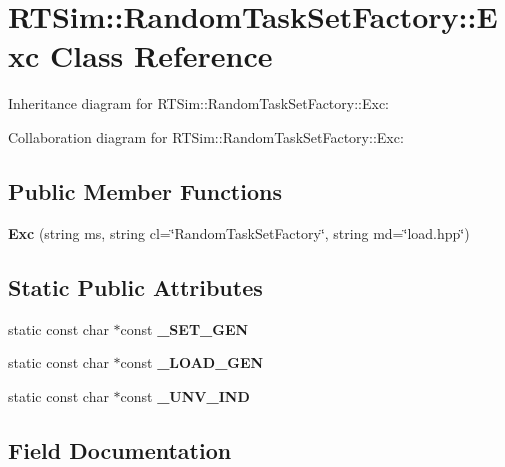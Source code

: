 \hypertarget{classRTSim_1_1RandomTaskSetFactory_1_1Exc}{}\section{R\+T\+Sim\+:\+:Random\+Task\+Set\+Factory\+:\+:Exc Class Reference}
\label{classRTSim_1_1RandomTaskSetFactory_1_1Exc}


Inheritance diagram for R\+T\+Sim\+:\+:Random\+Task\+Set\+Factory\+:\+:Exc\+:


Collaboration diagram for R\+T\+Sim\+:\+:Random\+Task\+Set\+Factory\+:\+:Exc\+:
\subsection*{Public Member Functions}
\begin{DoxyCompactItemize}
\item 
{\bfseries Exc} (string ms, string cl=\char`\"{}Random\+Task\+Set\+Factory\char`\"{}, string md=\char`\"{}load.\+hpp\char`\"{})\hypertarget{classRTSim_1_1RandomTaskSetFactory_1_1Exc_ad29f640c9ffe2681d9fc37649050dfd5}{}\label{classRTSim_1_1RandomTaskSetFactory_1_1Exc_ad29f640c9ffe2681d9fc37649050dfd5}

\end{DoxyCompactItemize}
\subsection*{Static Public Attributes}
\begin{DoxyCompactItemize}
\item 
static const char $\ast$const {\bfseries \+\_\+\+S\+E\+T\+\_\+\+G\+EN}
\item 
static const char $\ast$const {\bfseries \+\_\+\+L\+O\+A\+D\+\_\+\+G\+EN}
\item 
static const char $\ast$const {\bfseries \+\_\+\+U\+N\+V\+\_\+\+I\+ND}
\end{DoxyCompactItemize}


\subsection{Field Documentation}
